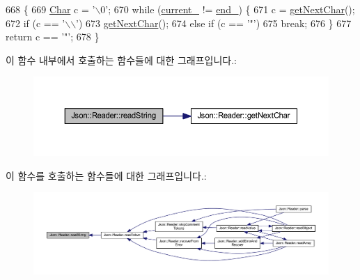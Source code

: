 \begin{DoxyCode}
668                         \{
669   \hyperlink{class_json_1_1_reader_a3eec9118f3e9a672ba8348c3a79d0f45}{Char} c = \textcolor{charliteral}{'\(\backslash\)0'};
670   \textcolor{keywordflow}{while} (\hyperlink{class_json_1_1_reader_a2f2feb5201a26da7aa133d2f7434479b}{current\_} != \hyperlink{class_json_1_1_reader_a714793579cbf4ee7c5a7223d2c8d77c1}{end\_}) \{
671     c = \hyperlink{class_json_1_1_reader_ab61eb61333cc9ec3afe785663a53ce90}{getNextChar}();
672     \textcolor{keywordflow}{if} (c == \textcolor{charliteral}{'\(\backslash\)\(\backslash\)'})
673       \hyperlink{class_json_1_1_reader_ab61eb61333cc9ec3afe785663a53ce90}{getNextChar}();
674     \textcolor{keywordflow}{else} \textcolor{keywordflow}{if} (c == \textcolor{charliteral}{'"'})
675       \textcolor{keywordflow}{break};
676   \}
677   \textcolor{keywordflow}{return} c == \textcolor{charliteral}{'"'};
678 \}
\end{DoxyCode}
이 함수 내부에서 호출하는 함수들에 대한 그래프입니다.\+:\nopagebreak
\begin{figure}[H]
\begin{center}
\leavevmode
\includegraphics[width=350pt]{class_json_1_1_reader_a6328a0b1994e05118886f9fc9c608643_cgraph}
\end{center}
\end{figure}
이 함수를 호출하는 함수들에 대한 그래프입니다.\+:\nopagebreak
\begin{figure}[H]
\begin{center}
\leavevmode
\includegraphics[width=350pt]{class_json_1_1_reader_a6328a0b1994e05118886f9fc9c608643_icgraph}
\end{center}
\end{figure}
\mbox{\label{class_json_1_1_reader_a7cb0631963cc0fd4ff6ed0f570976864}} 
